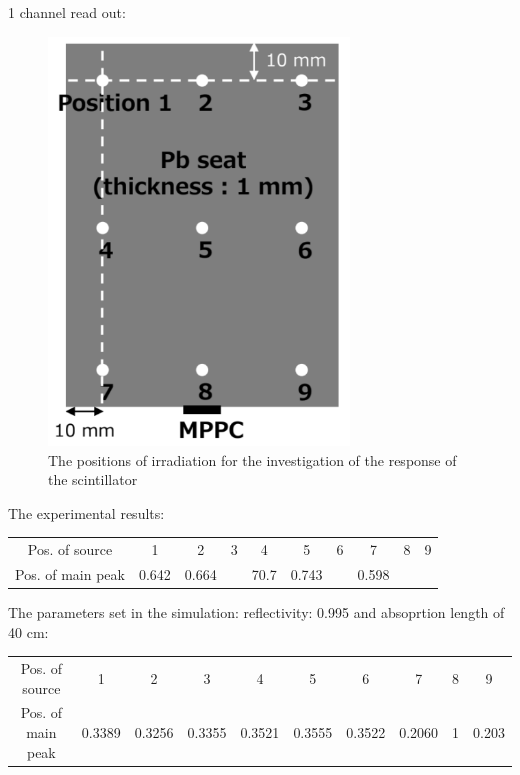 \documentclass[12pt, a4paper,titlepage]{article}
\numberwithin{equation}{section}
\numberwithin{figure}{section}
\begin{document}

1 channel read out:

\begin{figure}
\centering
\includegraphics[width=80.0mm]{images/positions.png}
\caption{The positions of irradiation for the investigation of the response of the scintillator}
\end{figure}

The experimental results:

\begin{center}
\begin{tabular}{ |c|c|c|c|c|c|c|c|c|c| } 
 \hline
  Pos. of source & 1 & 2 & 3 & 4 & 5 & 6 & 7 & 8 & 9 \\ 
  Pos. of main peak & 0.642 & 0.664 & & 70.7 & 0.743 & & 0.598 & &  \\ 
 \hline
\end{tabular}
\end{center}

The parameters set in the simulation: reflectivity: 0.995 and absoprtion length of
40 cm:

\begin{center}
\begin{tabular}{ |c|c|c|c|c|c|c|c|c|c| } 
 \hline
  Pos. of source & 1 & 2 & 3 & 4 & 5 & 6 & 7 & 8 & 9 \\ 
  Pos. of main peak & 0.3389 & 0.3256 & 0.3355 & 0.3521 & 0.3555 & 0.3522 & 0.2060 & 1 & 0.203  \\ 
 \hline
\end{tabular}
\end{center}
\end{document}
